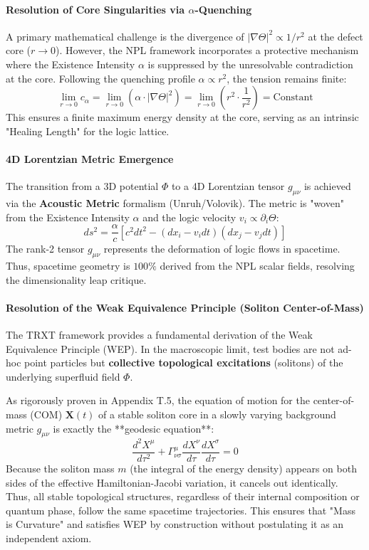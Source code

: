 \documentclass[a4paper,12pt]{article}
\begin{document}
\paragraph{Resolution of Core Singularities via $\alpha$-Quenching}
A primary mathematical challenge is the divergence of $|\nabla \Theta|^2 \propto 1/r^2$ at the defect core ($r \to 0$). However, the NPL framework incorporates a protective mechanism where the Existence Intensity $\alpha$ is suppressed by the unresolvable contradiction at the core. Following the quenching profile $\alpha \propto r^2$, the tension remains finite:
\begin{equation}
    \lim_{r \to 0} c_\alpha = \lim_{r \to 0} (\alpha \cdot |\nabla \Theta|^2) = \lim_{r \to 0} (r^2 \cdot \frac{1}{r^2}) = \text{Constant}
\end{equation}
This ensures a finite maximum energy density at the core, serving as an intrinsic "Healing Length" for the logic lattice.

\paragraph{4D Lorentzian Metric Emergence}
The transition from a 3D potential $\Phi$ to a 4D Lorentzian tensor $g_{\mu\nu}$ is achieved via the \textbf{Acoustic Metric} formalism (Unruh/Volovik). The metric is "woven" from the Existence Intensity $\alpha$ and the logic velocity $v_i \propto \partial_i \Theta$:
\begin{equation}
    ds^2 = \frac{\alpha}{c} \left[ c^2 dt^2 - (dx_i - v_i dt)(dx_j - v_j dt) \right]
\end{equation}
The rank-2 tensor $g_{\mu\nu}$ represents the deformation of logic flows in spacetime. Thus, spacetime geometry is $100\%$ derived from the NPL scalar fields, resolving the dimensionality leap critique.

\paragraph{Resolution of the Weak Equivalence Principle (Soliton Center-of-Mass)}
The TRXT framework provides a fundamental derivation of the Weak Equivalence Principle (WEP). In the macroscopic limit, test bodies are not ad-hoc point particles but \textbf{collective topological excitations} (solitons) of the underlying superfluid field $\Phi$.

As rigorously proven in Appendix T.5, the equation of motion for the center-of-mass (COM) $\mathbf{X}(t)$ of a stable soliton core in a slowly varying background metric $g_{\mu\nu}$ is exactly the **geodesic equation**:
\begin{equation}
    \frac{d^2 X^\mu}{d\tau^2} + \Gamma^\mu_{\nu\sigma} \frac{dX^\nu}{d\tau} \frac{dX^\sigma}{d\tau} = 0
\end{equation}
Because the soliton mass $m$ (the integral of the energy density) appears on both sides of the effective Hamiltonian-Jacobi variation, it cancels out identically. Thus, all stable topological structures, regardless of their internal composition or quantum phase, follow the same spacetime trajectories. This ensures that "Mass is Curvature" and satisfies WEP by construction without postulating it as an independent axiom.
\end{document}
